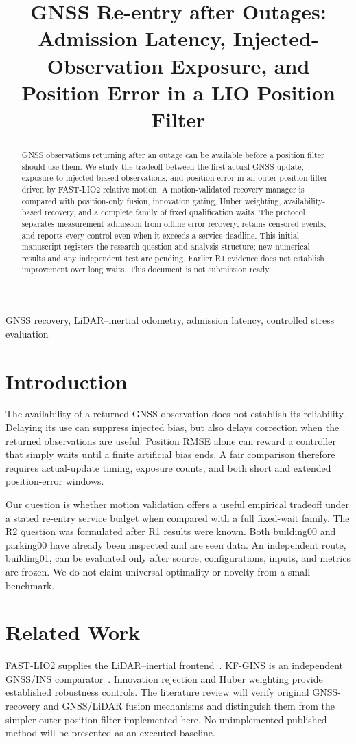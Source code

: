 \documentclass[conference]{IEEEtran}
\title{GNSS Re-entry after Outages: Admission Latency, Injected-Observation Exposure, and Position Error in a LIO Position Filter}
\author{\IEEEauthorblockN{Internal review draft: authors and affiliations unassigned}}
\begin{document}
\maketitle
\begin{abstract}
GNSS observations returning after an outage can be available before a position filter should use them. We study the tradeoff between the first actual GNSS update, exposure to injected biased observations, and position error in an outer position filter driven by FAST-LIO2 relative motion. A motion-validated recovery manager is compared with position-only fusion, innovation gating, Huber weighting, availability-based recovery, and a complete family of fixed qualification waits. The protocol separates measurement admission from offline error recovery, retains censored events, and reports every control even when it exceeds a service deadline. This initial manuscript registers the research question and analysis structure; new numerical results and any independent test are pending. Earlier R1 evidence does not establish improvement over long waits. This document is not submission ready.
\end{abstract}
\begin{IEEEkeywords}GNSS recovery, LiDAR--inertial odometry, admission latency, controlled stress evaluation\end{IEEEkeywords}
\section{Introduction}
The availability of a returned GNSS observation does not establish its reliability. Delaying its use can suppress injected bias, but also delays correction when the returned observations are useful. Position RMSE alone can reward a controller that simply waits until a finite artificial bias ends. A fair comparison therefore requires actual-update timing, exposure counts, and both short and extended position-error windows.

Our question is whether motion validation offers a useful empirical tradeoff under a stated re-entry service budget when compared with a full fixed-wait family. The R2 question was formulated after R1 results were known. Both building00 and parking00 have already been inspected and are seen data. An independent route, building01, can be evaluated only after source, configurations, inputs, and metrics are frozen. We do not claim universal optimality or novelty from a small benchmark.

\section{Related Work}
FAST-LIO2 supplies the LiDAR--inertial frontend~\cite{fastlio2}. KF-GINS is an independent GNSS/INS comparator~\cite{kfgins}. Innovation rejection and Huber weighting provide established robustness controls. The literature review will verify original GNSS-recovery and GNSS/LiDAR fusion mechanisms and distinguish them from the simpler outer position filter implemented here. No unimplemented published method will be presented as an executed baseline.
\end{document}
